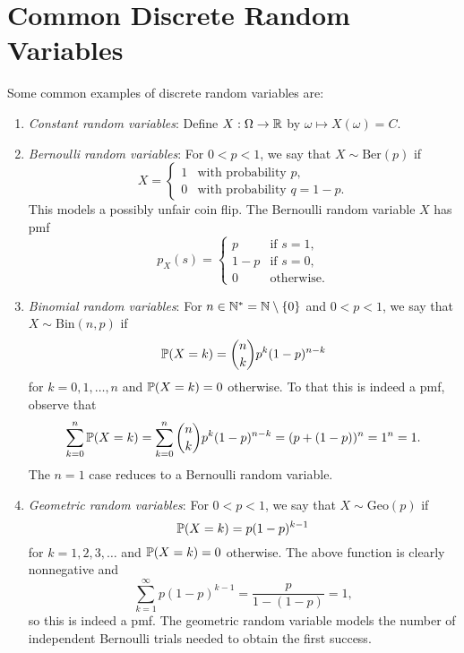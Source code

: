 \section{Common Discrete Random Variables}
\begin{example}
  Some common examples of discrete random variables
  are:
  \begin{enumerate}
    \item \emph{Constant random variables}:
      Define $X : \Omega \to \mathbb{R}$ by
      $\omega \mapsto X(\omega) = C$.
    \item \emph{Bernoulli random variables}:
      For $0 < p < 1$, we say that
      $X \sim \mathrm{Ber}(p)$ if
      \[
        X =
        \begin{cases}
          1 & \text{with probability } p, \\
          0 & \text{with probability } q = 1 - p.
        \end{cases}
      \]
      This models a possibly unfair
      coin flip. The Bernoulli random variable $X$
      has pmf
      \[
        p_X(s) =
        \begin{cases}
          p & \text{if } s = 1, \\
          1 - p & \text{if } s = 0, \\
          0 & \text{otherwise}.
        \end{cases}
      \]
    \item \emph{Binomial random variables}:
      For $n \in \mathbb{N}^* = \mathbb{N} \setminus \{0\}$ and $0 < p < 1$, we say that
      $X \sim \mathrm{Bin}(n, p)$ if
      \[
        \mathbb{P}(X = k) = \binom{n}{k} p^k (1 - p)^{n - k}
      \]
      for $k = 0, 1, \dots, n$ and $\mathbb{P}(X = k) = 0$
      otherwise. To that this is indeed a pmf,
      observe that
      \[
        \sum_{k = 0}^n \mathbb{P}(X = k) = \sum_{k = 0}^n \binom{n}{k} p^k (1 - p)^{n - k} = (p + (1 - p))^n = 1^n = 1.
      \]
      The $n = 1$ case reduces to a Bernoulli
      random variable.
    \item \emph{Geometric random variables}:
      For $0 < p < 1$, we say that
      $X \sim \mathrm{Geo}(p)$ if
      \[
        \mathbb{P}(X = k) = p(1 - p)^{k - 1}
      \]
      for $k = 1, 2, 3, \dots$ and
      $\mathbb{P}(X = k) = 0$ otherwise. The above function
      is clearly nonnegative and
      \[
        \sum_{k = 1}^\infty p(1 - p)^{k - 1}
        = \frac{p}{1 - (1 - p)} = 1,
      \]
      so this is indeed a pmf. The geometric
      random variable models the
      number of independent Bernoulli trials needed
      to obtain the first success.
  \end{enumerate}
\end{example}

